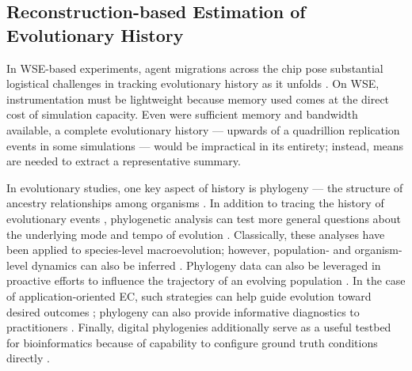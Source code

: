 \vspace{-4.0ex}
\subsection{Reconstruction-based Estimation of Evolutionary History}
\label{moreno:sec:case2:hstrat}
\vspace{-2.0ex}

In WSE-based experiments, agent migrations across the chip pose substantial logistical challenges in tracking evolutionary history as it unfolds \cite{moreno2024analysis}.
On WSE, instrumentation must be lightweight because memory used comes at the direct cost of simulation capacity.
Even were sufficient memory and bandwidth available, a complete evolutionary history --- upwards of a quadrillion replication events in some simulations \cite{singhvi2025scalable} --- would be impractical in its entirety; instead, means are needed to extract a representative summary.

In evolutionary studies, one key aspect of history is phylogeny --- the structure of ancestry relationships among organisms \cite{faithConservationEvaluationPhylogenetic1992, STAMATAKIS2005phylogenetics,frenchHostPhylogenyShapes2023,kim2006discovery,lenski2003evolutionary}.
In addition to tracing the history of evolutionary events \cite{dawkins2016ancestor,hedges2015tree,hinchliff2015synthesis}, phylogenetic analysis can test more general questions about the underlying mode and tempo of evolution \cite{felsenstein1985phylogenies}.
Classically, these analyses have been applied to species-level macroevolution; however, population- and organism-level dynamics can also be inferred \cite{genthon2023cell, levy2015quantitative,stadler2013recovering,Moreno2025ecology,lewinsohnStatedependentEvolutionaryModels2023a,nozoe2017inferring}.
Phylogeny data can also be leveraged in proactive efforts to influence the trajectory of an evolving population \cite{Scott2018}.
In the case of application-oriented EC, such strategies can help guide evolution toward desired outcomes \cite{lalejini2024phylogeny,lalejini2024runtime,murphy2008simple,burke2003increased,gabor2018inheritancebased,gabor2018preparing}; phylogeny can also provide informative diagnostics to practitioners \cite{hernandez2022can,shahbandegan2022untangling}.
Finally, digital phylogenies additionally serve as a useful testbed for bioinformatics because of capability to configure ground truth conditions directly \cite{daudey2024aevol,haller2023slim,moreno2025extending}.

